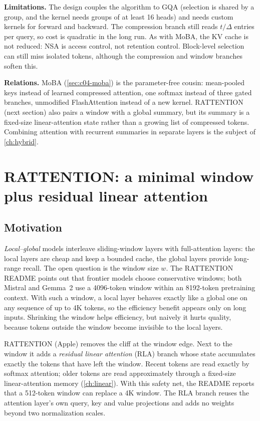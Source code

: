 \textbf{Limitations.} The design couples the algorithm to GQA (selection is shared by a group, and
the \fla{} kernel needs groups of at least 16 heads) and needs custom kernels for forward and
backward. The compression branch still reads $t/\Delta$ entries per query, so cost is quadratic
in the long run. As with MoBA, the KV cache is not reduced: NSA is access control, not retention
control. Block-level selection can still miss isolated tokens, although the compression and window
branches soften this.

\textbf{Relations.} MoBA (\cref{sec:c04-moba}) is the parameter-free cousin: mean-pooled keys
instead of learned compressed attention, one softmax instead of three gated branches, unmodified
FlashAttention instead of a new kernel. RATTENTION (next section) also pairs a window with a
global summary, but its summary is a fixed-size linear-attention state rather than a growing list
of compressed tokens. Combining attention with recurrent summaries in separate layers is the
subject of \cref{ch:hybrid}.

\section{RATTENTION: a minimal window plus residual linear attention}\label{sec:c04-rattention}

\subsection{Motivation}

\emph{Local--global} models interleave sliding-window layers with full-attention layers: the
local layers are cheap and keep a bounded cache, the global layers provide long-range recall.
The open question is the window size $w$. The RATTENTION README points out that frontier models
choose conservative windows; both Mistral \citep{c04-jiang2023mistral} and Gemma~2
\citep{c04-gemma2024gemma2} use a 4096-token window within an 8192-token pretraining context.
With such a window, a local layer behaves exactly like a global one on any sequence of up to 4K
tokens, so the efficiency benefit appears only on long inputs. Shrinking the window helps
efficiency, but naively it hurts quality, because tokens outside the window become invisible to
the local layers.

RATTENTION \citep{wang2025rattention} (Apple) removes the cliff at the window edge. Next to
the window it adds a \emph{residual linear attention} (RLA) branch whose state accumulates exactly
the tokens that have left the window. Recent tokens are read exactly by softmax attention; older
tokens are read approximately through a fixed-size linear-attention memory (\cref{ch:linear}).
With this safety net, the README reports that a 512-token window can replace a 4K window. The RLA
branch reuses the attention layer's own query, key and value projections and adds no weights
beyond two normalization scales.

